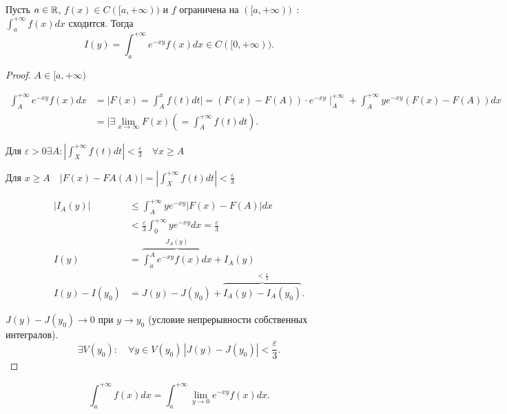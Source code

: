 \begin{lemma}
Пусть $a \in \mathbb{R}$, $f(x) \in C([a, +\infty))$ и $f$ ограничена на $([a, +\infty))$~:~~$\int_a^{+\infty } f(x) dx$ сходится. 
Тогда \[I(y) = \int_a^{+\infty }e^{-xy}f(x)dx \in C([0, +\infty )).\]
\end{lemma}
\begin{proof}
    $A \in [a, +\infty)$

    \begin{align*}
        \int_A^{+\infty }e^{-xy} f(x) dx &= \Bigg| F(x) = \int_A^x f(t)dt \Bigg|  = (F(x) - F(A))\cdot e^{-xy}\mid_A^{+\infty } + \int_A^{+\infty } ye^{-xy} ( F(x) - F(A) ) dx\\
        &= \Bigg| \exists \lim_{x \to \infty} F(x) \left( = \int_A^{+\infty } f(t) dt \right).
    \end{align*}

    Для $\varepsilon >0 \exists A: \left| \int_X^{+\infty }f(t)dt \right| < \frac{\varepsilon}{3}\quad \forall x \geqslant A $

    Для $x \geqslant A\quad \left| F(x) - FA(A) \right|  = \left| \int_X^{+\infty }f(t)dt \right|< \frac{\varepsilon}{3} $
    
    \begin{align*}
    \left| I_A(y) \right| &\leqslant \int_A^{+\infty }ye^{-xy}\left| F(x) - F(A) \right|dx \\
    &< \frac{\varepsilon}{3}\int_0^{+\infty } ye^{-xy}dx = \frac{\varepsilon}{3}\\
    I(y) &= \overbrace{\int_a^Ae^{-xy}f(x)dx}^{J_A(y)} + I_A(y)\\
    I(y) - I(y_0) &= J(y) - J(y_0) + \overbrace{I_A(y) - I_A(y_0)}^{< \frac{\varepsilon}{3}}
    .\end{align*}

    $J(y) - J(y_0) \to 0$ при $y \to y_0$ (условие непрерывности собственных интегралов). 
    \[\exists V(y_0):\quad \forall y\in V(y_0)\, \left| J(y) - J(y_0) \right|< \frac{\varepsilon}{3}. \]
\end{proof}

\begin{corollary}
    \[
    \int_a^{+\infty }f(x)dx = \int_a^{+\infty }\lim_{y \to 0} e^{-xy}f(x)dx.\] 
\end{corollary}


